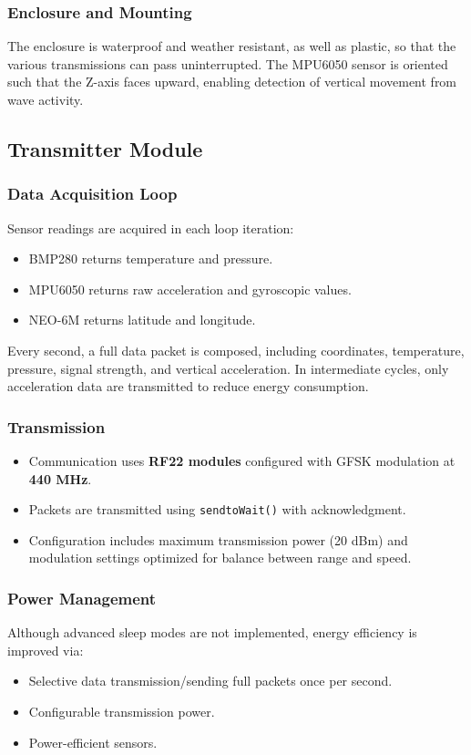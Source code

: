 \documentclass{article}
\begin{document}
\subsubsection{Enclosure and Mounting}
The enclosure is waterproof and weather resistant, as well as plastic, so that the various transmissions can pass uninterrupted. The MPU6050 sensor is oriented such that the Z-axis faces upward, enabling detection of vertical movement from wave activity.

\subsection{Transmitter Module}
\subsubsection{Data Acquisition Loop}
Sensor readings are acquired in each loop iteration:
\begin{itemize}
    \item BMP280 returns temperature and pressure.
    \item MPU6050 returns raw acceleration and gyroscopic values.
    \item NEO-6M returns latitude and longitude.
\end{itemize}
Every second, a full data packet is composed, including coordinates, temperature, pressure, signal strength, and vertical acceleration. In intermediate cycles, only acceleration data are transmitted to reduce energy consumption.

\subsubsection{Transmission}
\begin{itemize}
    \item Communication uses \textbf{RF22 modules} configured with GFSK modulation at \textbf{440 MHz}.
    \item Packets are transmitted using \texttt{sendtoWait()} with acknowledgment.
    \item Configuration includes maximum transmission power (20 dBm) and modulation settings optimized for balance between range and speed.
\end{itemize}

\subsubsection{Power Management}
Although advanced sleep modes are not implemented, energy efficiency is improved via:
\begin{itemize}
    \item Selective data transmission/sending full packets once per second.
    \item Configurable transmission power.
    \item Power-efficient sensors.
\end{itemize}
\end{document}
